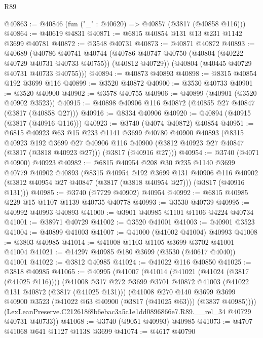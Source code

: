 \begin{lexlean}{R89}
\begin{coremodule}
@40863 := @40846 (fun ("_" : @40620) => @40857 (@3817 (@40858 @116)))
@40864 := @40619 @4831
@40871 := @6815 @40854 @131 @13 @231 @1142 @3699 @40781
@40872 := @3548 @40731
@40873 := @40871 @40872
@40893 := @40689
    (@40786
      @40741
      @40744
      (@40786 @40747 @40750 (@40804 (@40222 @40729 @40731 @40733 @40755)) (@40812 @40729))
      (@40804 (@40445 @40729 @40731 @40733 @40755)))
@40894 := @40873 @40893
@40898 := @8315 @40854 @192 @3699 @116
@40899 := @3520 @40872
@40900 := @3530 @40733
@40901 := @3520 @40900
@40902 := @3578 @40755
@40906 := @40899 (@40901 (@3520 @40902 @3523))
@40915 := @40898 @40906 @116 @40872 (@40855 @27 @40847 (@3817 (@40858 @27)))
@40916 := @8334 @40906
@40920 := @40894 (@40915 (@3817 (@40916 @116)))
@40923 := @3740 (@4074 @40872) @40854
@40951 := @6815
    @40923
    @63
    @15
    @233
    @1141
    @3699
    @40780
    @40900
    @40893
    (@8315
      @40923
      @192
      @3699
      @27
      @40906
      @116
      @40900
      (@3812 @40923 @27 @40847 (@3817 (@3818 @40923 @27)))
      (@3817 (@40916 @27)))
@40954 := @3740 (@4071 @40900) @40923
@40982 := @6815
    @40954
    @208
    @30
    @235
    @1140
    @3699
    @40779
    @40902
    @40893
    (@8315
      @40954
      @192
      @3699
      @131
      @40906
      @116
      @40902
      (@3812 @40954 @27 @40847 (@3817 (@3818 @40954 @27)))
      (@3817 (@40916 @131)))
@40985 := @3740 (@7729 @40902) @40954
@40992 := @6815 @40985 @229 @15 @1107 @1139 @40735 @40778
@40993 := @3530 @40739
@40995 := @40992 @40993 @40893
@41000 := @3901 @40985 @1101 @1106 @4224 @40734
@41001 := @38971 @40729
@41002 := @3520 @41001
@41003 := @40901 @3523
@41004 := @40899 @41003
@41007 := @41000 (@41002 @41004) @40993
@41008 := @3803 @40985
@41014 := @41008 @1103 @1105 @3699 @3702 @41001 @41004
@41021 := @14297 @40985 @180 @3699 (@3530 (@40617 @4040)) @41001
@41022 := @3812 @40985
@41024 := @41022 @116 @40850
@41025 := @3818 @40985
@41065 := @40995
    (@41007
      (@41014
        (@41021 (@41024 (@3817 (@41025 @116))))
        (@41008
          @317
          @272
          @3699
          @3701
          @40872
          @41003
          (@41022 @131 @40872 (@3817 (@41025 @131)))
          (@41008
            @270
            @140
            @3699
            @3699
            @40900
            @3523
            (@41022 @63 @40900 (@3817 (@41025 @63)))
            (@3837 @40985))))
      (LexLeanPreserve.C212618f8b6ebac3a5c1e1dd0896866e7.R89.__rel_34 @40729 @40731 @40733))
@41068 := @3740 (@9051 @40993) @40985
@41073 := @4707 @41068 @641 @1127 @1138 @3699
@41074 := @4617 @40790

\end{coremodule}
\end{lexlean}
